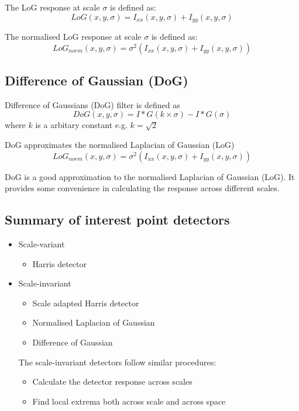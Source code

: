 \documentclass{report}
\begin{document}
The LoG response at scale $\sigma$ is defined as:
$$
    LoG(x,y,\sigma) = I_{xx}(x,y,\sigma) + I_{yy}(x,y,\sigma)
$$

The normalised LoG response at scale $\sigma$ is defined as:
$$
    LoG_{norm}(x,y,\sigma) = \sigma^2(I_{xx}(x,y,\sigma) + I_{yy}(x,y,\sigma))
$$

\subsection{Difference of Gaussian (DoG)}

Difference of Gaussians (DoG) filter is defined as
$$
    DoG(x,y,\sigma) = I * G(k \times \sigma) - I * G(\sigma)
$$
where $k$ is a arbitary constant e.g. $k=\sqrt{2}$

DoG approximates the normalised Laplacian of Gaussian (LoG)
$$
    LoG_{norm}(x,y,\sigma) = \sigma^2(I_{xx}(x,y,\sigma) + I_{yy}(x,y,\sigma))
$$

DoG is a good approximation to the normalised Laplacian of Gaussian (LoG). It
provides some convenience in calculating the response across different
scales. 

\subsection{Summary of interest point detectors}
\begin{itemize}
    \item Scale-variant
    \begin{itemize}
        \item Harris detector
    \end{itemize}

    \item Scale-invariant
    \begin{itemize}
        \item Scale adapted Harris detector
        \item Normalised Laplacian of Gaussian
        \item Difference of Gaussian
    \end{itemize}

    The scale-invariant detectors follow similar procedures:
    \begin{itemize}
        \item Calculate the detector response across scales
        \item Find local extrema both across scale and across space
    \end{itemize}
\end{itemize}
\end{document}

